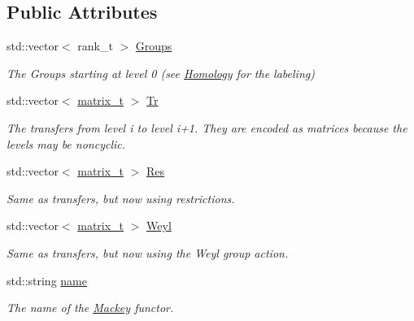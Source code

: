 \subsection*{Public Attributes}
\begin{DoxyCompactItemize}
\item 
std\+::vector$<$ rank\+\_\+t $>$ \hyperlink{classMackey_1_1MackeyFunctor_a4f8f5f7ac6267bdee2a67c8874bdd9a3}{Groups}
\begin{DoxyCompactList}\small\item\em The Groups starting at level 0 (see \hyperlink{classMackey_1_1Homology}{Homology} for the labeling) \end{DoxyCompactList}\item 
std\+::vector$<$ \hyperlink{classMackey_1_1MackeyFunctor_a271550bc911da5c842bbc90d8bf87973}{matrix\+\_\+t} $>$ \hyperlink{classMackey_1_1MackeyFunctor_ae695013be3025f6841326e2ca0d03754}{Tr}
\begin{DoxyCompactList}\small\item\em The transfers from level i to level i+1. They are encoded as matrices because the levels may be noncyclic. \end{DoxyCompactList}\item 
std\+::vector$<$ \hyperlink{classMackey_1_1MackeyFunctor_a271550bc911da5c842bbc90d8bf87973}{matrix\+\_\+t} $>$ \hyperlink{classMackey_1_1MackeyFunctor_a2a659b146972121a5d180c8c38909780}{Res}
\begin{DoxyCompactList}\small\item\em Same as transfers, but now using restrictions. \end{DoxyCompactList}\item 
std\+::vector$<$ \hyperlink{classMackey_1_1MackeyFunctor_a271550bc911da5c842bbc90d8bf87973}{matrix\+\_\+t} $>$ \hyperlink{classMackey_1_1MackeyFunctor_a0b2f1a52b0a49f7544ba1025bbe95319}{Weyl}
\begin{DoxyCompactList}\small\item\em Same as transfers, but now using the Weyl group action. \end{DoxyCompactList}\item 
std\+::string \hyperlink{classMackey_1_1MackeyFunctor_ae1d69a215249d8b1018ac810ecc63d56}{name}
\begin{DoxyCompactList}\small\item\em The name of the \hyperlink{namespaceMackey}{Mackey} functor. \end{DoxyCompactList}\end{DoxyCompactItemize}


